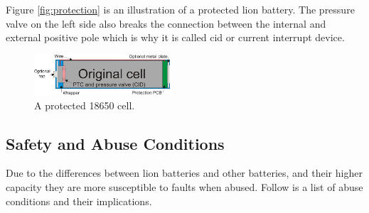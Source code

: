 Figure \autoref{fig:protection} is an illustration of a protected \gls{lion} battery. The pressure valve on the left side also breaks the connection between the internal and external positive pole which is why it is called \gls{cid} or current interrupt device.

\begin{figure}[H]
	\centering
	\includegraphics[width=0.45\textwidth]{Figures/protection.png}
	\caption{A protected 18650 cell.}
	\label{fig:protection}
\end{figure}

\subsection{Safety and Abuse Conditions}
Due to the differences between \gls{lion} batteries and other batteries, and their higher capacity they are more susceptible to faults when abused. Follow is a list of abuse conditions and their implications\cite{book35}.

